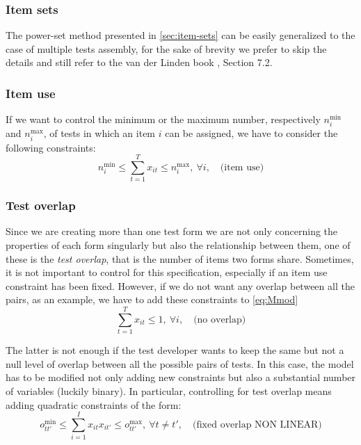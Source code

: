\subsubsection{Item sets}
The power-set method presented in \ref{sec:item-sets} can be easily generalized to the case of multiple tests assembly, for the sake of brevity we prefer to skip the details and still refer to the van der Linden book \textcite{VDL2005}, Section 7.2.
\subsubsection{Item use}\label{sec:item-use}
If we want to control the minimum or the maximum number, respectively $n^{\min}_i$ and $n^{\max}_i$, of tests in which an item $i$ can be assigned, we have to consider the following constraints:
\begin{subequations}[resume]
	\begin{equation}\label{eq:Mmod:Muse}
	n^{\min}_i \le \sum_{t=1}^T x_{it} \le n^{\max}_i, \ \forall i, \quad \mbox{(item use)}
	\end{equation}
\end{subequations}

\subsubsection{Test overlap}\label{sec:test-overlap}
Since we are creating more than one test form we are not only concerning the properties of each form singularly but also the relationship between them, one of these is the \emph{test overlap}, that is the number of items two forms share.
Sometimes, it is not important to control for this specification, especially if an item use constraint has been fixed.
However, if we do not want any overlap between all the pairs, as an example, we have to add these constraints to \eqref{eq:Mmod}
\begin{subequations}[resume]
	\begin{equation}\label{eq:Mmod:noOL}
	\sum_{t=1}^T{x_{it}} \leq 1, \ \forall i, \quad \mbox{(no overlap)}
	\end{equation}
\end{subequations}

The latter is not enough if the test developer wants to keep the same but not a null level of overlap between all the possible pairs of tests.
In this case, the model has to be modified not only adding new constraints but also a substantial number of variables (luckily binary).
In particular, controlling for test overlap means adding quadratic constraints of the form:
\begin{subequations}[intermezzo]
	\begin{equation*}
	o^{\min}_{tt'} \le \sum_{i=1}^I{x_{it}x_{it'}} \le o^{\max}_{tt'}, \ \forall t \neq t', \quad \mbox{(fixed overlap NON LINEAR)}
	\end{equation*}
\end{subequations}


